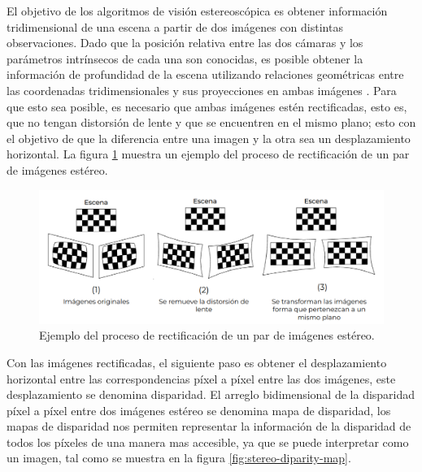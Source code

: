 El objetivo de los algoritmos de visión estereoscópica es obtener información tridimensional de una escena a partir de dos imágenes con distintas observaciones. Dado que la posición relativa entre las dos cámaras y los parámetros intrínsecos de cada una son conocidas, es posible obtener la información de profundidad de la escena utilizando relaciones geométricas entre las coordenadas tridimensionales y sus proyecciones en ambas imágenes \cite{sterovis}. Para que esto sea posible, es necesario que ambas imágenes estén rectificadas, esto es, que no tengan distorsión de lente y que se encuentren en el mismo plano; esto con el objetivo de que la diferencia entre una imagen y la otra sea un desplazamiento horizontal. La figura \ref{fig:stereo-rectification} muestra un ejemplo del proceso de rectificación de un par de imágenes estéreo.

\begin{figure}[H]
    \centering
    \includegraphics[scale=0.4]{partes/img/rectificacion.png}
    \caption[Ejemplo del proceso de rectificación de un par de imágenes estéreo.]{Ejemplo del proceso de rectificación de un par de imágenes estéreo\footnotemark.}
    \label{fig:stereo-rectification}
\end{figure}

Con las imágenes rectificadas, el siguiente paso es obtener el desplazamiento horizontal entre las correspondencias píxel a píxel entre las dos imágenes, este desplazamiento se denomina disparidad. El arreglo bidimensional de la disparidad píxel a píxel entre dos imágenes estéreo se denomina mapa de disparidad, los mapas de disparidad nos permiten representar la información de la disparidad de todos los píxeles de una manera mas accesible, ya que se puede interpretar como un imagen, tal como se muestra en la figura \ref{fig:stereo-diparity-map}.

